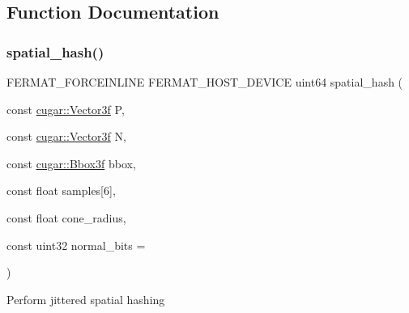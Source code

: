 \subsection{Function Documentation}
\mbox{\label{group___spatial_hash_module_ga04c40211588f9601e16bc99d3bef70ed}} 
\subsubsection{\texorpdfstring{spatial\+\_\+hash()}{spatial\_hash()}\hspace{0.1cm}{\footnotesize\ttfamily [1/2]}}
{\footnotesize\ttfamily F\+E\+R\+M\+A\+T\+\_\+\+F\+O\+R\+C\+E\+I\+N\+L\+I\+NE F\+E\+R\+M\+A\+T\+\_\+\+H\+O\+S\+T\+\_\+\+D\+E\+V\+I\+CE uint64 spatial\+\_\+hash (\begin{DoxyParamCaption}\item[{const \hyperlink{structcugar_1_1_vector}{cugar\+::\+Vector3f}}]{P,  }\item[{const \hyperlink{structcugar_1_1_vector}{cugar\+::\+Vector3f}}]{N,  }\item[{const \hyperlink{structcugar_1_1_bbox}{cugar\+::\+Bbox3f}}]{bbox,  }\item[{const float}]{samples\mbox{[}6\mbox{]},  }\item[{const float}]{cone\+\_\+radius,  }\item[{const uint32}]{normal\+\_\+bits = {} }\end{DoxyParamCaption})}

Perform jittered spatial hashing \mbox{\label{group___spatial_hash_module_ga2513a4c97931956f4af57ea0e56a6829}} 
